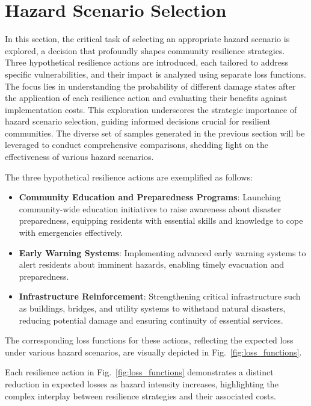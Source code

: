 \section{Hazard Scenario Selection}
    In this section, the critical task of selecting an appropriate hazard scenario is explored, a decision that profoundly shapes community resilience strategies. Three hypothetical resilience actions are introduced, each tailored to address specific vulnerabilities, and their impact is analyzed using separate loss functions. The focus lies in understanding the probability of different damage states after the application of each resilience action and evaluating their benefits against implementation costs. This exploration underscores the strategic importance of hazard scenario selection, guiding informed decisions crucial for resilient communities. The diverse set of samples generated in the previous section will be leveraged to conduct comprehensive comparisons, shedding light on the effectiveness of various hazard scenarios.

    The three hypothetical resilience actions are exemplified as follows:
    \begin{itemize}
        \item \textbf{Community Education and Preparedness Programs}: Launching community-wide education initiatives to raise awareness about disaster preparedness, equipping residents with essential skills and knowledge to cope with emergencies effectively.
        \item \textbf{Early Warning Systems}: Implementing advanced early warning systems to alert residents about imminent hazards, enabling timely evacuation and preparedness.
        \item \textbf{Infrastructure Reinforcement}: Strengthening critical infrastructure such as buildings, bridges, and utility systems to withstand natural disasters, reducing potential damage and ensuring continuity of essential services.
    \end{itemize}

    The corresponding loss functions for these actions, reflecting the expected loss under various hazard scenarios, are visually depicted in Fig.~\ref{fig:loss_functions}.

    
    
    Each resilience action in Fig.~\ref{fig:loss_functions} demonstrates a distinct reduction in expected losses as hazard intensity increases, highlighting the complex interplay between resilience strategies and their associated costs.


